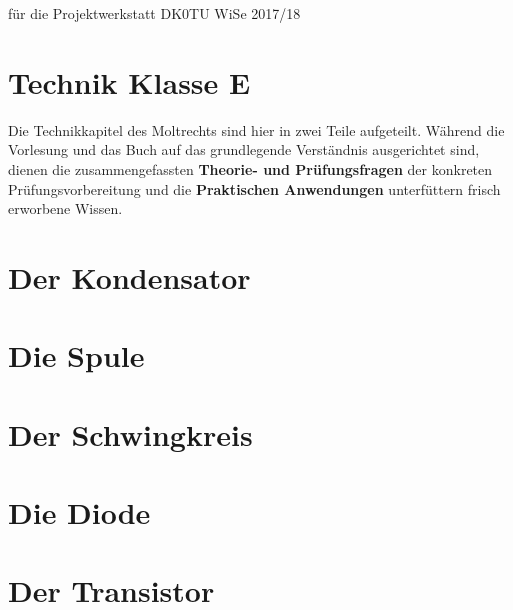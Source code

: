 \documentclass[ngerman, openany, twoside]{Script}
\begin{document}

%
	{für die Projektwerkstatt DK0TU}%
	{WiSe 2017/18}%

\newpage

\newpage
\tableofcontents
\newpage



\chapter{Technik Klasse E}

    Die Technikkapitel des Moltrechts sind hier in zwei Teile aufgeteilt.
    Während die Vorlesung und das Buch auf das grundlegende Verständnis
    ausgerichtet sind, dienen die zusammengefassten \textbf{Theorie- und
    Prüfungsfragen} der konkreten Prüfungsvorbereitung und die
    \textbf{Praktischen Anwendungen} unterfüttern frisch erworbene Wissen.

\clearpage



\chapter{Der Kondensator}


\chapter{Die Spule}


\chapter{Der Schwingkreis}


\chapter{Die Diode}


\chapter{Der Transistor}


\newpage \vspace*{5cm}
\newpage
\end{document}
